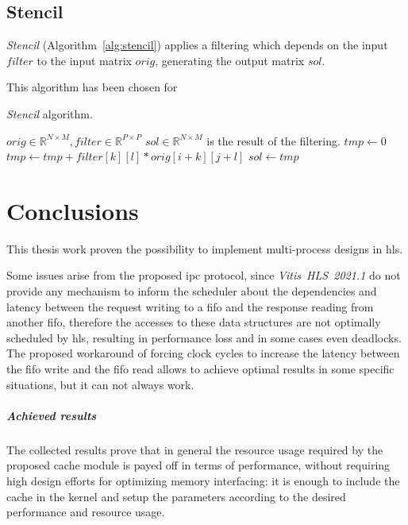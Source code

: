 \documentclass[11pt,a4paper,oneside]{memoir}
\begin{document}
\section{Stencil}
\emph{Stencil} (Algorithm~\ref{alg:stencil}) applies a filtering which depends
on the input $filter$ to the input matrix $orig$, generating the output matrix
$sol$.

This algorithm has been chosen for 

\begin{algorithm}
	\caption{\emph{Stencil} algorithm.}\label{alg:stencil}
	\begin{algorithmic}
		\Require $orig \in \mathbb{R}^{N \times M},
		filter \in \mathbb{R}^{P \times P}$
		\Ensure $sol \in \mathbb{R}^{N \times M}$ is the result of the
		filtering.
					\State $tmp \gets 0$
							\State $tmp \gets tmp +
								filter[k][l] *
								orig[i + k][j + l]$
						\EndFor
					\EndFor
					\State $sol \gets tmp$
				\EndFor
			\EndFor
		\EndProcedure
	\end{algorithmic}
\end{algorithm}

\chapter{Conclusions}
This thesis work proven the possibility to implement multi-process designs in
\ac{hls}.

Some issues arise from the proposed \acl{ipc} protocol, since
\emph{Vitis~HLS~2021.1} do not provide any mechanism to inform the scheduler
about the dependencies and latency between the request writing to a \ac{fifo}
and the response reading from another \ac{fifo}, therefore the accesses to
these data structures are not optimally scheduled by \ac{hls}, resulting in
performance loss and in some cases even deadlocks.
The proposed workaround of forcing clock cycles to increase the latency between
the \ac{fifo} write and the \ac{fifo} read allows to achieve optimal results in
some specific situations, but it can not always work.

\paragraph{Achieved results}
The collected results prove that in general the resource usage required by the
proposed cache module is payed off in terms of performance, without requiring
high design efforts for optimizing memory interfacing: it is enough to include
the cache in the kernel and setup the parameters according to the desired
performance and resource usage.
\end{document}
